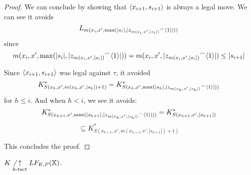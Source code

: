\begin{proof}
We can conclude by showing that $\langle x_{i+1},s_{i+1}\rangle$ is always a legal move. We can see it avoids 
  \[
  L_{m(x_{i},x',\max(|s_{i}|,|{z_{m(x_i,x',|s_i|)}}^\frown\langle1\rangle|))}
  \]
since
  \[
    m(x_{i},x',\max(|s_{i}|,|{z_{m(x_i,x',|s_i|)}}^\frown\langle1\rangle|)) =
    m(x_{i},x',|{z_{m(x_i,x',|s_i|)}}^\frown\langle1\rangle|) \leq
    |s_{i+1}|
  \]

Since $\langle x_{i+1},s_{i+1}\rangle$ was legal against $\tau$, it avoided
  \[
    K^*_{S(x_h,x',m(x_h,x',|s_h|)+1)} = 
    K^*_{S(x_h,x',\max(|s_h|,|{z_{m(x_h,x',|s_h|)}}^\frown\langle1\rangle|))}
  \]
for $h\leq i$. And when $h<i$, we see it avoids:
  \[
    K^*_{S(x_{h+1},x',\max(|s_{h+1}|,|{z_{m(x_h,x',|s_h|)}}^\frown\langle1\rangle|))} =
    K^*_{S(x_{h+1},x',|s_{h+1}|)}
  \]
  \[
    \subseteq
    K^*_{S(x_{h+1},x',m(x_{h+1},x',|s_{h+1}|)+1)}
  \]

This concludes the proof.
\end{proof}

\begin{theorem}
$K\not\underset{k\text{-tact}}{\uparrow}LF_{K,P}(\mathbb{X})$.
\end{theorem}

